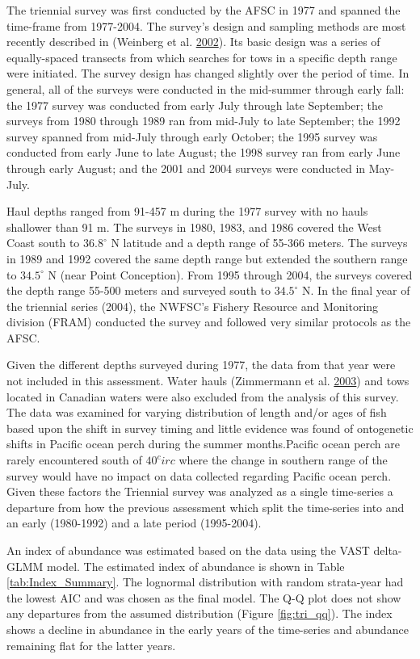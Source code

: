 \documentclass[12pt,]{article}
\begin{document}
The triennial survey was first conducted by the AFSC in 1977 and spanned
the time-frame from 1977-2004. The survey's design and sampling methods
are most recently described in (Weinberg et al.
\protect\hyperlink{ref-weinberg_estimation_2002}{2002}). Its basic
design was a series of equally-spaced transects from which searches for
tows in a specific depth range were initiated. The survey design has
changed slightly over the period of time. In general, all of the surveys
were conducted in the mid-summer through early fall: the 1977 survey was
conducted from early July through late September; the surveys from 1980
through 1989 ran from mid-July to late September; the 1992 survey
spanned from mid-July through early October; the 1995 survey was
conducted from early June to late August; the 1998 survey ran from early
June through early August; and the 2001 and 2004 surveys were conducted
in May-July.

Haul depths ranged from 91-457 m during the 1977 survey with no hauls
shallower than 91 m. The surveys in 1980, 1983, and 1986 covered the
West Coast south to \(36.8^\circ\) N latitude and a depth range of
55-366 meters. The surveys in 1989 and 1992 covered the same depth range
but extended the southern range to \(34.5^\circ\) N (near Point
Conception). From 1995 through 2004, the surveys covered the depth range
55-500 meters and surveyed south to \(34.5^\circ\) N. In the final year
of the triennial series (2004), the NWFSC's Fishery Resource and
Monitoring division (FRAM) conducted the survey and followed very
similar protocols as the AFSC.

Given the different depths surveyed during 1977, the data from that year
were not included in this assessment. Water hauls (Zimmermann et al.
\protect\hyperlink{ref-zimmermann_influence_2003}{2003}) and tows
located in Canadian waters were also excluded from the analysis of this
survey. The data was examined for varying distribution of length and/or
ages of fish based upon the shift in survey timing and little evidence
was found of ontogenetic shifts in Pacific ocean perch during the summer
months.Pacific ocean perch are rarely encountered south of \(40^circ\)
where the change in southern range of the survey would have no impact on
data collected regarding Pacific ocean perch. Given these factors the
Triennial survey was analyzed as a single time-series a departure from
how the previous assessment which split the time-series into and an
early (1980-1992) and a late period (1995-2004).

An index of abundance was estimated based on the data using the VAST
delta-GLMM model. The estimated index of abundance is shown in Table
\ref{tab:Index_Summary}. The lognormal distribution with random
strata-year had the lowest AIC and was chosen as the final model. The
Q-Q plot does not show any departures from the assumed distribution
(Figure \ref{fig:tri_qq}). The index shows a decline in abundance in the
early years of the time-series and abundance remaining flat for the
latter years.
\end{document}
